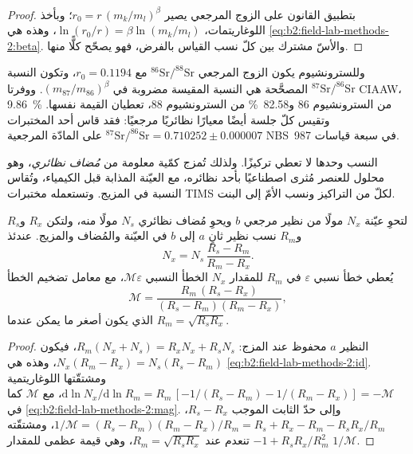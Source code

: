 \begin{proof}
بتطبيق القانون على الزوج المرجعي يصير $r_0 = r\,(m_k/m_l)^\beta$؛ وبأخذ اللوغاريتمات،
$\ln(r_0/r) = \beta\ln(m_k/m_l)$، وهذه هي \eqref{eq:b2:field-lab-methods-2:beta}. والأسّ
مشترك بين كلّ نسب القياس بالفرض، فهو يصحّح كلًّا منها.
\end{proof}

وللسترونشيوم يكون الزوج المرجعي $^{86}\mathrm{Sr}/^{88}\mathrm{Sr}$ مع $r_0 = 0.1194$، وتكون
النسبة $^{87}\mathrm{Sr}/^{86}\mathrm{Sr}$ المصحَّحة هي النسبة المقيسة مضروبة في
$(m_{87}/m_{86})^\beta$. ووفرتا CIAAW، \qty{9.86}{\percent} من السترونشيوم 86
و\qty{82.58}{\percent} من السترونشيوم 88، تعطيان القيمة نفسها. وتقيس كلّ جلسة أيضًا معيارًا
نظائريًا مرجعيًا: فقد قاس أحد المختبرات \mbox{$^{87}\mathrm{Sr}/^{86}\mathrm{Sr} = 0.710252 \pm
0.000007$} على المادّة المرجعية NBS~987 في سبعة قياسات.

النسب وحدها لا تعطي تركيزًا. ولذلك تُمزج كمّية معلومة من \emph{مُضاف نظائري}، وهو محلول
للعنصر مُثرى اصطناعيًا بأحد نظائره، مع العيّنة المذابة قبل
الكيمياء، وتُقاس النسبة في المزيج. وتستعمله مختبرات TIMS لكلّ من
التراكيز ونسب الأمّ إلى البنت.

\begin{proposition}\label{prop:b2:field-lab-methods-2:id}
لتحوِ عيّنة $N_x$ مولًا من نظير مرجعي $b$ ويحوِ مُضاف نظائري $N_s$ مولًا منه، ولتكن
$R_x$ و$R_s$ و$R_m$ نسب نظير ثانٍ $a$ إلى $b$ في العيّنة والمُضاف
والمزيج. عندئذ
\begin{equation}
N_x = N_s\,\frac{R_s - R_m}{R_m - R_x} .
\label{eq:b2:field-lab-methods-2:id}
\end{equation}
يُعطي خطأ نسبي $\varepsilon$ في $R_m$ للمقدار $N_x$ الخطأ النسبي $\mathcal{M}\varepsilon$،
مع معامل تضخيم الخطأ
\begin{equation}
\mathcal{M} = \frac{R_m\,(R_s - R_x)}{(R_s - R_m)(R_m - R_x)} ,
\label{eq:b2:field-lab-methods-2:mag}
\end{equation}
الذي يكون أصغر ما يمكن عندما $R_m = \sqrt{R_s R_x}$.
\end{proposition}

\begin{proof}
النظير $a$ محفوظ عند المزج: $R_m(N_x + N_s) = R_x N_x + R_s N_s$، فيكون $N_x(R_m - R_x) =
N_s(R_s - R_m)$، وهذه هي \eqref{eq:b2:field-lab-methods-2:id}. ومشتقّتها اللوغاريتمية
$\mathrm{d}\ln N_x/\mathrm{d}\ln R_m = R_m\,[-1/(R_s - R_m) - 1/(R_m - R_x)] = -\mathcal{M}$، مع
$\mathcal{M}$ كما في \eqref{eq:b2:field-lab-methods-2:mag}. وإلى حدّ الثابت الموجب $R_s - R_x$،
$1/\mathcal{M} = (R_s - R_m)(R_m - R_x)/R_m = R_s + R_x - R_m - R_sR_x/R_m$، ومشتقّته
$-1 + R_sR_x/R_m^2$ تنعدم عند $R_m = \sqrt{R_sR_x}$، وهي قيمة عظمى للمقدار $1/\mathcal{M}$.
\end{proof}

